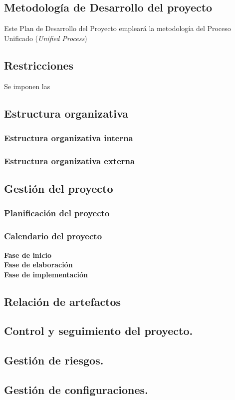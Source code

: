 \documentclass[twoside]{report}
\begin{document}
\subsection{Metodología de Desarrollo del proyecto}
Este Plan de Desarrollo del Proyecto empleará la metodología del Proceso Unificado (\textit{Unified Process})
\subsection{Restricciones}
Se imponen las 
\subsection{Estructura organizativa}
\subsubsection{Estructura organizativa interna}
\subsubsection{Estructura organizativa externa}
\subsection{Gestión del proyecto}
\subsubsection{Planificación del proyecto}
\subsubsection{Calendario del proyecto}
\textbf{Fase de inicio}\\
\textbf{Fase de elaboración}\\
\textbf{Fase de implementación}\\
\subsection{Relación de artefactos}
\subsection{Control y seguimiento del proyecto.}
\subsection{Gestión de riesgos.}
\subsection{Gestión de configuraciones.}
\end{document}
